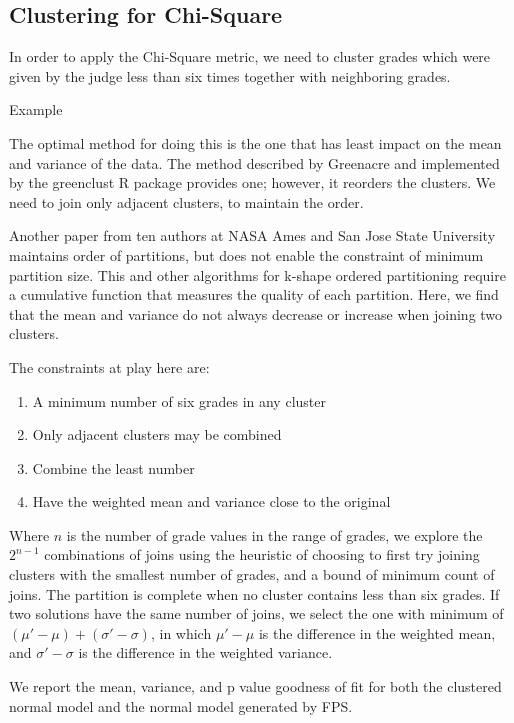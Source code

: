 \subsection{Clustering for Chi-Square}

In order to apply the Chi-Square metric, we need to cluster grades which
were given by the judge less than six times together with neighboring
grades.

Example

The optimal method for doing this is the one that has least impact on
the mean and variance of the data. The method described by
Greenacre \cite{Greenacre}
and implemented by the
greenclust \cite{greenclust}
R package provides one; however, it reorders the clusters.
We need to join only adjacent clusters, to maintain the order.

Another paper
\cite{partitioning}
from ten authors at NASA Ames and San Jose State University
maintains order of partitions, but does not enable the constraint of
minimum partition size. This and other algorithms for k-shape
ordered partitioning require a cumulative
function that measures the quality of each partition.
Here, we find that the mean and variance do not always decrease or
increase when joining two clusters.

The constraints at play here are:
\begin{enumerate}
\item{A minimum number of six grades in any cluster}
\item{Only adjacent clusters may be combined}
\item{Combine the least number}
\item{Have the weighted mean and variance close to the original}
\end{enumerate}

Where $n$ is the number of grade values in the range of grades,
we explore the $2^{n-1}$ combinations of joins using the heuristic
of choosing to first try joining clusters with the smallest number of grades,
and a bound of minimum count of joins. The partition
is complete when no cluster contains less than six grades. If two solutions
have the same number of joins, we select the one with minimum of
$(\mu' - \mu) + (\sigma' - \sigma)$, in which
$\mu' - \mu$ is
the difference in the weighted mean, and
$\sigma' - \sigma$ is
the difference in the weighted variance.

We report the mean, variance, and p value goodness of fit
for both the clustered normal model and the normal model generated by FPS.

